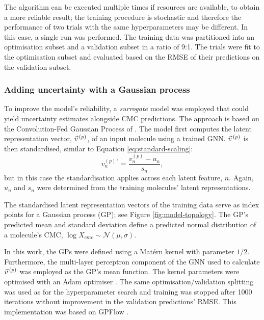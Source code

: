 The algorithm can be executed multiple times if resources are available, to
obtain a more reliable result; the training procedure is stochastic and
therefore the performance of two trials with the same hyperparameters may be
different. In this case, a single run was performed. The training data was
partitioned into an optimisation subset and a validation subset in a ratio of
9:1. The trials were fit to the optimisation subset and evaluated based on the
RMSE of their predictions on the validation subset.

\subsubsection{Adding uncertainty with a Gaussian process}

To improve the model's reliability, a \emph{surrogate} model was employed that
could yield uncertainty estimates alongside CMC predictions. The approach is
based on the Convolution-Fed Gaussian Process of
\citet{tranMethodsComparingUncertainty2020}. The model first computes the latent
representation vector, $\vec{v}^{\,(p)}{}$, of an input molecule using a trained GNN.
$\vec{v}^{\,(p)}{}$ is then standardised, similar to Equation \ref{eq:standard-scaling}:
\begin{equation}
    v^{(p)\,\prime}_n = \frac{v^{(p)}_n - u_n}{s_n},
\end{equation}
but in this case the standardisation applies across each latent feature, $n$.
Again, $u_n$ and $s_n$ were determined from the training molecules' latent
representations.

The standardised latent representation vectors of the training data serve as
index points for a Gaussian process (GP); see Figure \ref{fig:model-topology}.
The GP's predicted mean and standard deviation define a predicted normal
distribution of a molecule's CMC, $\log X_{cmc} \sim \mathcal{N}(\mu, \sigma)$.

In this work, the GPs  were defined using a Mat\'ern kernel with parameter
$1/2$. Furthermore, the multi-layer perceptron component of the GNN used to
calculate $\vec{v}^{\,(p)}{}$ was employed as the GP's mean function. The kernel parameters
were optimised with an Adam optimiser \cite{kingmaAdamMethodStochastic2017a}.
The same optimisation/validation splitting was used as for the hyperparameter
search and training was stopped after \num{1000} iterations without improvement
in the validation predictions' RMSE. This implementation was based on GPFlow
\cite{matthewsGPflowGaussianProcess2017}.